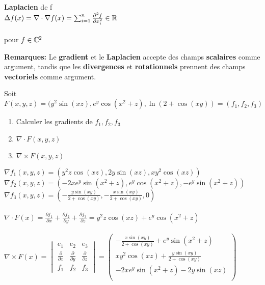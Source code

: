 \begin{myDefinition} {\bf Laplacien} de f\\
	$\Delta f(x)=\nabla \cdot \nabla f(x)=\sum_{i=1}^{n}\frac{\partial^2f}{\partial x_i^2}\in\mathbb{R}$
	\\\\
	pour $f\in \mathbb{C}^2$
\end{myDefinition}

{\bf Remarques:} Le {\bf gradient} et le {\bf Laplacien} accepte des champs {\bf scalaires} comme argument, tandis que les {\bf divergences} et {\bf rotationnels} prennent des champs {\bf vectoriels} comme argument.

\begin{myExample}
	Soit $F(x, y, z) =(y^2\sin(xz), e^y \cos(x^2 + z), \ln(2 + \cos(xy))=(f_1,f_2,f_3)$
	\\
	\begin{enumerate}
		\item Calculer les gradients de $f_1,f_2,f_3$
		\item $\nabla \cdot F(x,y,z)$
		\item $\nabla \times F(x,y,z)$
	\end{enumerate}
	$\nabla f_1(x,y,z)=(y^2z\cos(xz), 2y\sin(xz),xy^2\cos(xz))$
	\\
	$\nabla f_2(x,y,z)=(-2xe^y\sin(x^2+z),  e^y \cos(x^2 + z), -e^y \sin(x^2 + z))$
	\\
	$\nabla f_3(x,y,z)=(-\frac{y\sin{(xy)}}{2+\cos(xy)},  -\frac{x\sin{(xy)}}{2+\cos(xy)}, 0)$
	\\\\
	$\nabla \cdot F(x)=\frac{\partial f_1}{\partial x}+\frac{\partial f_2}{\partial y}+\frac{\partial f_3}{\partial z}=y^2z\cos(xz)+e^y \cos(x^2 + z)$
	\\\\
	$\nabla \times F(x)=
		\begin{vmatrix}
			e_1&e_2&e_3
			\\
			\frac{\partial}{\partial x}&\frac{\partial}{\partial y}&\frac{\partial}{\partial z}
			\\
			f_1&f_2&f_3
		\end{vmatrix}
	=
		\begin{pmatrix}
		-\frac{x\sin{(xy)}}{2+\cos(xy)}+e^y \sin(x^2 + z)
		\\
		xy^2\cos(xz)+\frac{y\sin{(xy)}}{2+\cos(xy)}
		\\  
		-2xe^y\sin(x^2+z)-2y\sin(xz)
		\\
		\end{pmatrix}$
\end{myExample}

